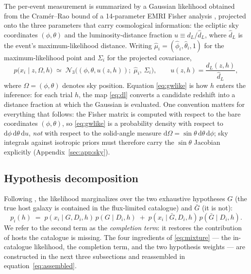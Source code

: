 The per-event measurement is summarized by a Gaussian likelihood
obtained from the Cram\'er--Rao bound of a 14-parameter EMRI Fisher
analysis
\citep{Vallisneri:2007ev}, projected onto the three parameters that
carry cosmological information: the ecliptic sky coordinates
$(\phi, \theta)$ and the luminosity-distance fraction
$u \equiv d_L / \hat d_L$, where $\hat d_L$ is the event's
maximum-likelihood distance.  Writing $\hat\mu_i = (\hat\phi_i,
\hat\theta_i, 1)$ for the maximum-likelihood point and $\Sigma_i$ for
the projected covariance,
\begin{equation}
  p\big(x_i \mid z, \Omega, h\big) \;\simeq\;
  \mathcal{N}_3\!\big( (\phi, \theta, u(z,h));\; \hat\mu_i,\, \Sigma_i \big),
  \qquad
  u(z,h) = \frac{d_L(z,h)}{\hat d_L},
  \label{eq:gwlike}
\end{equation}
where $\Omega = (\phi,\theta)$ denotes sky position.  Equation
\eqref{eq:gwlike} is how $h$ enters the inference: for each trial $h$,
the map \eqref{eq:dl} converts a candidate redshift into a distance
fraction at which the Gaussian is evaluated.  One convention matters
for everything that follows: the Fisher matrix is computed with
respect to the bare coordinates $(\phi,\theta)$, so
\eqref{eq:gwlike} is a probability density with respect to
$\mathrm{d}\phi\,\mathrm{d}\theta\,\mathrm{d}u$, \emph{not} with
respect to the solid-angle measure
$\mathrm{d}\Omega = \sin\theta\,\mathrm{d}\theta\,\mathrm{d}\phi$;
sky integrals against isotropic priors must therefore carry the
$\sin\theta$ Jacobian explicitly (Appendix~\ref{sec:app:sky}).

\subsection{Hypothesis decomposition}
\label{sec:framework:decomposition}

Following \citet{Gray:2019ksv}, the likelihood marginalizes over the
two exhaustive hypotheses $G$ (the true host galaxy is contained in
the flux-limited catalogue) and $\bar G$ (it is not):
\begin{equation}
  p_i(h) \;=\;
  p(x_i \mid G, D_i, h)\, p(G \mid D_i, h)
  \;+\;
  p(x_i \mid \bar G, D_i, h)\, p(\bar G \mid D_i, h).
  \label{eq:mixture}
\end{equation}
We refer to the second term as the \emph{completion term}: it restores
the contribution of hosts the catalogue is missing.  The four
ingredients of \eqref{eq:mixture} --- the in-catalogue likelihood, the
completion term, and the two hypothesis weights --- are constructed in
the next three subsections and reassembled in
equation~\eqref{eq:assembled}.

